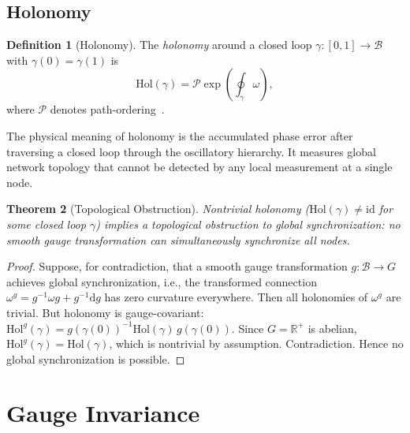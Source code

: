 \documentclass[11pt,twocolumn,a4paper]{article}
\newtheorem{theorem}{Theorem}[section]
\theoremstyle{definition}
\newtheorem{definition}[theorem]{Definition}
\newcommand{\R}{\mathbb{R}}
\newcommand{\Bsp}{\mathcal{B}}
\newcommand{\dif}{\mathrm{d}}
\begin{document}
\subsection{Holonomy}\label{sec:fb:holonomy}

\begin{definition}[Holonomy]\label{def:holonomy}
The \emph{holonomy} around a closed loop $\gamma: [0,1] \to \Bsp$ with $\gamma(0) = \gamma(1)$
is
\begin{equation}\label{eq:holonomy}
  \mathrm{Hol}(\gamma) = \mathcal{P}\exp\!\left(\oint_\gamma \omega\right),
\end{equation}
where $\mathcal{P}$ denotes path-ordering~\cite{nakahara2003}.
\end{definition}

The physical meaning of holonomy is the accumulated phase error after traversing a closed
loop through the oscillatory hierarchy. It measures global network topology that cannot
be detected by any local measurement at a single node.

\begin{theorem}[Topological Obstruction]\label{thm:topo_obstruction}
Nontrivial holonomy ($\mathrm{Hol}(\gamma) \neq \mathrm{id}$ for some closed loop $\gamma$)
implies a topological obstruction to global synchronization: no smooth gauge transformation
can simultaneously synchronize all nodes.
\end{theorem}

\begin{proof}
Suppose, for contradiction, that a smooth gauge transformation $g: \Bsp \to G$ achieves
global synchronization, i.e., the transformed connection $\omega^g = g^{-1}\omega g +
g^{-1}\dif g$ has zero curvature everywhere. Then all holonomies of $\omega^g$ are trivial.
But holonomy is gauge-covariant: $\mathrm{Hol}^g(\gamma) = g(\gamma(0))^{-1}
\mathrm{Hol}(\gamma) \, g(\gamma(0))$. Since $G = \R^+$ is abelian,
$\mathrm{Hol}^g(\gamma) = \mathrm{Hol}(\gamma)$, which is nontrivial by assumption.
Contradiction. Hence no global synchronization is possible.
\end{proof}


\section{Gauge Invariance}\label{sec:gauge}
\end{document}
